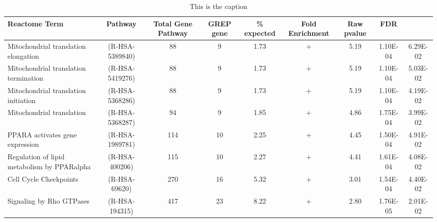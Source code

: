 

\begin{table}[ht]
\centering
\begin{adjustbox}{width=1\textwidth}
\small
\begin{tabular}{ l c c c c c c c c}
 \hline
 Reactome Term & Pathway	& Total Gene Pathway &	GREP gene & \% expected & Fold Enrichment	& Raw pvalue & FDR \\ [0.5ex]
 \hline
Mitochondrial translation elongation  & (R-HSA-5389840) & 88 & 9 & 1.73 & + & 5.19 & 1.10E-04 & 6.29E-02 \\
Mitochondrial translation termination  & (R-HSA-5419276) & 88 & 9 & 1.73 & + & 5.19 & 1.10E-04 & 5.03E-02 \\
Mitochondrial translation initiation  & (R-HSA-5368286) & 88 & 9 & 1.73 & + & 5.19 & 1.10E-04 & 4.19E-02 \\
Mitochondrial translation  & (R-HSA-5368287) & 94 & 9 & 1.85 & + & 4.86 & 1.75E-04 & 3.99E-02 \\
PPARA activates gene expression  & (R-HSA-1989781) & 114 & 10 & 2.25 & + & 4.45 & 1.50E-04 & 4.91E-02 \\
Regulation of lipid metabolism by PPARalpha  & (R-HSA-400206) & 115 & 10 & 2.27 & + & 4.41 & 1.61E-04 & 4.08E-02 \\
Cell Cycle Checkpoints  & (R-HSA-69620) & 270 & 16 & 5.32 & + & 3.01 & 1.54E-04 & 4.40E-02 \\
Signaling by Rho GTPases  & (R-HSA-194315) & 417 & 23 & 8.22 & + & 2.80 & 1.76E-05 & 2.01E-02 \\
\hline
\end{tabular}
\end{adjustbox}
\caption{This is the caption }
\label{tab:rectomepathways}
\end{table}


\begin{landscape}
\begin{table}[]
\caption{\textit{FMNL2} TT haplotype - HGVS - Human Genome Variation Society}
\label{tab:fmnl2}
\end{table}
\end{landscape}

